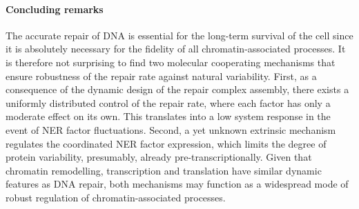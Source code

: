 %
%
%
%

\paragraph{Concluding remarks}
The accurate repair of DNA is essential for the long-term survival of the cell since it is absolutely necessary for the fidelity of all chromatin-associated processes. It is therefore not surprising to find two molecular cooperating mechanisms that ensure robustness of the repair rate against natural variability. First, as a consequence of the dynamic design of the repair complex assembly, there exists a uniformly distributed control of the repair rate, where each factor has only a moderate effect on its own. This translates into a low system response in the event of NER factor fluctuations. Second, a yet unknown extrinsic mechanism regulates the coordinated NER factor expression, which limits the degree of protein variability, presumably, already pre-transcriptionally. Given that chromatin remodelling, transcription and translation have similar dynamic features as DNA repair, both mechanisms may function as a widespread mode of robust regulation of chromatin-associated processes. 